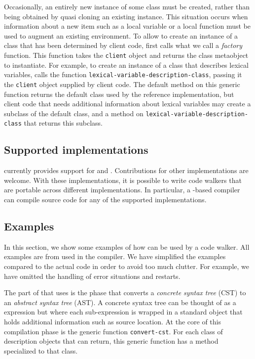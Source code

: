 Occasionally, an entirely new instance of some class must be created,
rather than being obtained by quasi cloning an existing instance.
This situation occurs when information about a new item such as a
local variable or a local function must be used to augment an existing
environment.  To allow \trucler{} to create an instance of a class
that has been determined by client code, \trucler{} first calls what
we call a \emph{factory} function.  This function takes the
\texttt{client} object and returns the class metaobject to
instantiate.  For example, to create an instance of a class that
describes lexical variables, \trucler calls the function
\texttt{lexical-variable-description-class}, passing it the
\texttt{client} object supplied by client code.  The default method on
this generic function returns the default class used by the reference
implementation, but client code that needs additional information
about lexical variables may create a subclass of the default class,
and a method on \texttt{lexical-variable-description-class} that
returns this subclass.

\subsection{Supported \commonlisp{} implementations}
\label{trucler-supported-implementations}

\trucler{} currently provides support for \sbcl{} and \ccl{}.
Contributions for other \commonlisp{} implementations are welcome.
With these implementations, it is possible to write code walkers that
are portable across different \commonlisp{} implementations.  In
particular, a \cleavir{}-based compiler can compile source code for
any of the supported implementations.

\subsection{Examples}

In this section, we show some examples of how \trucler{} can be used
by a code walker.  All examples are from \cleavir{} used in the
\sicl{} compiler.  We have simplified the examples compared to the
actual code in order to avoid too much clutter.  For example, we have
omitted the handling of error situations and restarts.

The part of \cleavir{} that uses \trucler{} is the phase that converts
a \emph{concrete syntax tree} (CST) to an \emph{abstract syntax tree}
(AST).  A concrete syntax tree can be thought of as a \commonlisp{}
expression but where each sub-expression is wrapped in a standard
object that holds additional information such as source location.  At
the core of this compilation phase is the generic function
\texttt{convert-cst}.  For each class of description objects that
\trucler{} can return, this generic function has a method specialized
to that class.

